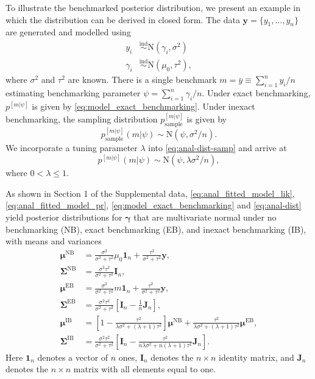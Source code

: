 \documentclass[12pt]{article}
\newcommand{\ind}{\stackrel{\text{ind}}{\sim}}
\begin{document}
To illustrate the benchmarked posterior distribution, we present an example in which the distribution can be derived in closed form. The data $\bm{y} = \{y_1, \dots, y_n\}$ are generated and modelled using
\begin{align}
  y_i &\ind \text{N}(\gamma_i,\sigma^2) \label{eq:anal_fitted_model_lik} \\
  \gamma_i & \ind \text{N}(\mu_0,\tau^2) \label{eq:anal_fitted_model_pr},
\end{align}
where $\sigma^2$ and $\tau^2$ are known.  There is a single benchmark $m = \bar{y}\equiv \sum_{i=1}^n y_i / n$ estimating benchmarking parameter $\psi = \sum_{i=1}^n \gamma_i / n$. Under exact benchmarking, $p^{[m|\psi]}$ is given by \eqref{eq:model_exact_benchmarking}.  Under inexact benchmarking, the sampling distribution $p^{[m|\psi]}_{\text{sample}}$ is given by
\begin{equation}
p^{[m|\psi]}_{\text{sample}}(m|\psi) \sim \text{N}(\psi, \sigma^2/n).\label{eq:anal-dist-samp}
\end{equation}
We incorporate a tuning parameter $\lambda$ into \eqref{eq:anal-dist-samp} and arrive at
\begin{equation}
p^{[m|\psi]}(m|\psi)\sim \text{N}(\psi, \lambda\sigma^2/n), \label{eq:anal-dist}
\end{equation}
where $0< \lambda\leq 1$.

As shown in Section 1 of the Supplemental data, \eqref{eq:anal_fitted_model_lik}, \eqref{eq:anal_fitted_model_pr}, \eqref{eq:model_exact_benchmarking} and \eqref{eq:anal-dist} yield posterior distributions for $\bm{\gamma}$ that are multivariate normal under no benchmarking (NB), exact benchmarking (EB), and inexact benchmarking (IB), with means and variances
\begin{align}
  \bm{\mu}^{\text{NB}} & =\frac{\sigma^2}{\sigma^2+\tau^2}\mu_0\bm{1}_n+\frac{\tau^2}{\sigma^2+\tau^2}\bm{y}, \\
  \bm{\Sigma}^{\text{NB}} &=\frac{\sigma^2 \tau^2}{\sigma^2 + \tau^2} \bm{I}_n, \label{eq:anal-post-NB} \\
\bm{\mu}^{\text{EB}} & =\frac{\sigma^2}{\sigma^2+\tau^2} m \bm{1}_n+\frac{\tau^2}{\sigma^2+\tau^2}\bm{y}, \\
 \bm{\Sigma}^{\text{EB}} &=\frac{\sigma^2 \tau^2}{\sigma^2 + \tau^2} \left[ \bm{I}_n-\frac{1}{n}\bm{J}_n \right], \label{eq:anal-post-EB} \\
  \bm{\mu}^{\text{IB}} &=\left[1-\frac{\tau^2}{\lambda\sigma^2+(\lambda+1)\tau^2}\right]\bm{\mu}^{\text{NB}}+\frac{\tau^2}{\lambda\sigma^2+(\lambda+1)\tau^2}\bm{\mu}^{\text{EB}}, \\ \bm{\Sigma}^{\text{IB}}& =\frac{\sigma^2\tau^2}{\sigma^2+\tau^2}\left[\bm{I}_n
-
\frac{\tau^2}{n\lambda\sigma^2+n(\lambda+1)\tau^2}\bm{J}_n\right]. \label{eq:anal-post-IB}
\end{align}
Here $\bm{1}_n$ denotes a vector of  $n$ ones, $\bm{I}_n$ denotes the $n\times n$ identity matrix, and $\bm{J}_n$ denotes the $n\times n$ matrix with all elements equal to one.
\end{document}
